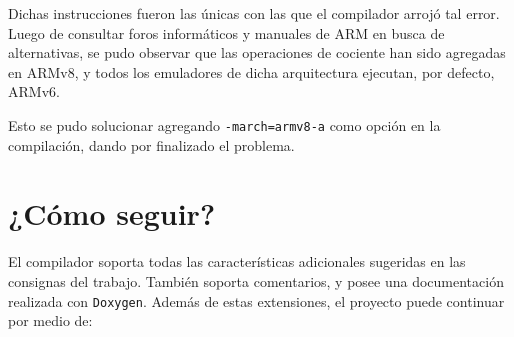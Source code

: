 \documentclass[12pt,spanish]{article}
\begin{document}
Dichas instrucciones fueron las únicas con las que el compilador arrojó tal error. Luego de consultar foros informáticos y manuales de ARM en busca de alternativas, se pudo observar que las operaciones de cociente han sido agregadas en ARMv8, y todos los emuladores de dicha arquitectura ejecutan, por defecto, ARMv6. 

Esto se pudo solucionar agregando \texttt{-march=armv8-a} como opción en la compilación, dando por finalizado el problema.

\section{¿Cómo seguir?}
El compilador soporta todas las características adicionales sugeridas en las consignas del trabajo. También soporta comentarios, y posee una documentación realizada con \texttt{Doxygen}.
Además de estas extensiones, el proyecto puede continuar por medio de:
\end{document}
